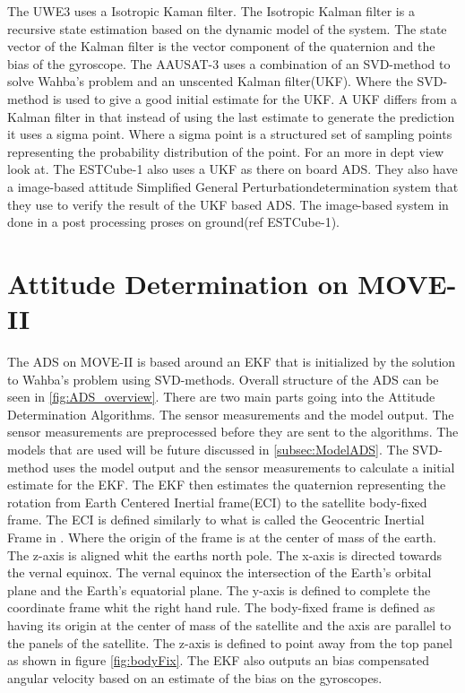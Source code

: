 The UWE3 uses a Isotropic Kaman filter. The Isotropic Kalman filter is a recursive state estimation based on the dynamic model of the system. The state vector of the Kalman filter is the vector component of the quaternion and the bias of the gyroscope\cite{UWE-3}. The AAUSAT-3 uses a combination of an SVD-method to solve Wahba's problem and an unscented Kalman filter(UKF). Where the SVD-method is used to give a good initial estimate for the UKF. A UKF differs from a Kalman filter in that instead of using the last estimate to generate the prediction it uses a sigma point. Where a sigma point is a structured set of sampling points representing the probability distribution of the point. For an more in dept view look at\cite{attdetSur}. The ESTCube-1 also uses a UKF as there on board ADS. They also have a image-based attitude Simplified General Perturbationdetermination system that they use to verify the result of the UKF based ADS. The image-based system in done in a post processing proses on ground(ref ESTCube-1).          

\section{Attitude Determination on MOVE-II}
The ADS on MOVE-II is based around an EKF that is initialized by the solution to Wahba's problem using SVD-methods. Overall structure of the ADS can be seen in \autoref{fig:ADS_overview}. There are two main parts going into the Attitude Determination Algorithms. The sensor measurements and the model output. The sensor measurements are preprocessed before they are sent to the algorithms. The models that are used will be future discussed in \autoref{subsec:ModelADS}. The SVD-method uses the model output and the sensor measurements to calculate a initial estimate for the EKF. The EKF then estimates the quaternion representing the rotation from Earth Centered Inertial frame(ECI) to the satellite body-fixed frame. The ECI is defined similarly to what is called the Geocentric Inertial Frame in \cite{SADCS}. Where the origin of the frame is at the center of mass of the earth. The z-axis is aligned whit the earths north pole. The x-axis is directed towards the vernal equinox. The vernal equinox the intersection of the Earth's orbital plane and the Earth's equatorial plane. The y-axis is defined to complete the coordinate frame whit the right hand rule. The body-fixed frame is defined as having its origin at the center of mass of the satellite and the axis are parallel to the panels of the satellite. The z-axis is defined to point away from the top panel as shown in figure \autoref{fig:bodyFix}. The EKF also outputs an bias compensated angular velocity based on an estimate of the bias on the gyroscopes.

